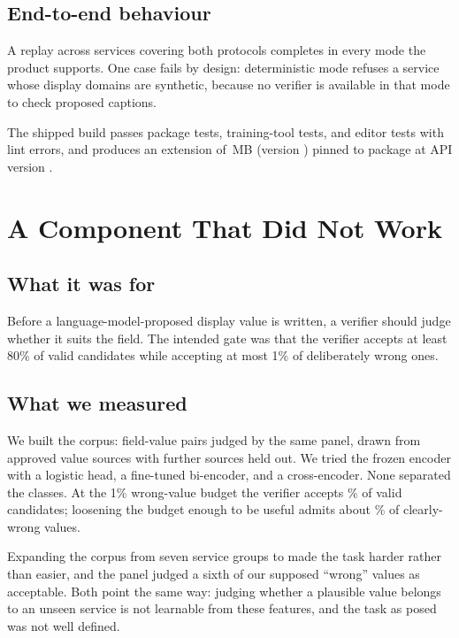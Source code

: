 \documentclass[journal]{IEEEtran}
\begin{document}
\subsection{End-to-end behaviour}

A replay across \ReplayServices{} services covering both protocols
completes in every mode the product supports. One case fails by design:
deterministic mode refuses a service whose display domains are
synthetic, because no verifier is available in that mode to check
proposed captions.

The shipped build passes \PackageTests{} package tests,
\TrainingTests{} training-tool tests, and \EditorTests{} editor tests
with \LintErrors{} lint errors, and produces an extension of
\VsixMB{}\,MB (version \VsixVersion{}) pinned to package
\PackageVersion{} at API version \ApiVersion{}.

\section{A Component That Did Not Work}
\label{sec:relevance}

\subsection{What it was for}

Before a language-model-proposed display value is written, a verifier
should judge whether it suits the field. The intended gate was that the
verifier accepts at least 80\% of valid candidates while accepting at
most 1\% of deliberately wrong ones.

\subsection{What we measured}

We built the corpus: \RelevancePairs{} field-value pairs judged by the
same panel, drawn from \RelevanceTrainGroups{} approved value sources
with \RelevanceSealedGroups{} further sources held out. We tried the
frozen encoder with a logistic head, a fine-tuned bi-encoder, and a
cross-encoder. None separated the classes. At the 1\% wrong-value budget
the verifier accepts \RelevancePositiveRate\% of valid candidates;
loosening the budget enough to be useful admits about
\RelevanceLooseNegativeRate\% of clearly-wrong values.

Expanding the corpus from seven service groups to
\RelevanceTrainGroups{} made the task harder rather than easier, and the
panel judged a sixth of our supposed ``wrong'' values as acceptable.
Both point the same way: judging whether a plausible value belongs to an
unseen service is not learnable from these features, and the task as
posed was not well defined.
\end{document}
